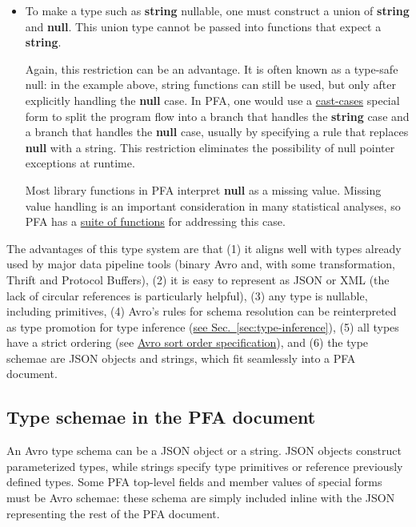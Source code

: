 \documentclass{article}
\newcommand{\PFAc}{\ttfamily\bfseries}
\theoremstyle{definition}
\begin{document}
\begin{itemize}
\item To make a type such as {\bf string} nullable, one must construct a union of {\bf string} and {\bf null}.  This union type cannot be passed into functions that expect a {\bf string}.

Again, this restriction can be an advantage.  It is often known as a type-safe null: in the example above, string functions can still be used, but only after explicitly handling the {\bf null} case.  In PFA, one would use a \hyperlink{hsec:casting}{cast-cases} special form to split the program flow into a branch that handles the {\bf string} case and a branch that handles the {\bf null} case, usually by specifying a rule that replaces {\PFAc null} with a string.  This restriction eliminates the possibility of null pointer exceptions at runtime.

Most library functions in PFA interpret {\PFAc null} as a missing value.  Missing value handling is an important consideration in many statistical analyses, so PFA has a \hyperlink{hsec:impute}{suite of functions} for addressing this case.
\end{itemize}

The advantages of this type system are that (1) it aligns well with types already used by major data pipeline tools (binary Avro and, with some transformation, Thrift and Protocol Buffers), (2) it is easy to represent as JSON or XML (the lack of circular references is particularly helpful), (3) any type is nullable, including primitives, (4) Avro's rules for schema resolution can be reinterpreted as type promotion for type inference (\hyperlink{hsec:type-inference}{see Sec.~\ref{sec:type-inference}}), (5) all types have a strict ordering (see \href{http://avro.apache.org/docs/1.7.6/spec.html#order}{Avro sort order specification}), and (6) the type schemae are JSON objects and strings, which fit seamlessly into a PFA document.

\subsection{Type schemae in the PFA document}

An Avro type schema can be a JSON object or a string.  JSON objects construct parameterized types, while strings specify type primitives or reference previously defined types.  Some PFA top-level fields and member values of special forms must be Avro schemae: these schema are simply included inline with the JSON representing the rest of the PFA document.
\end{document}
